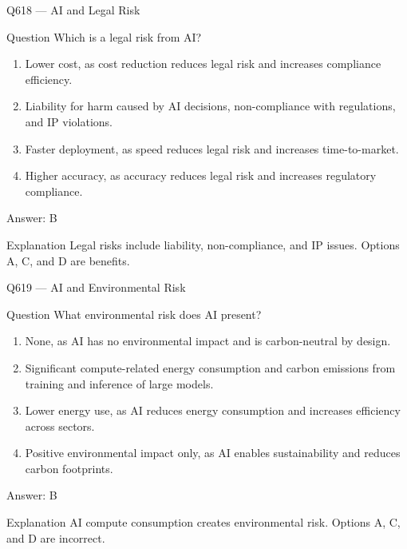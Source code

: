\documentclass[aspectratio=169,8pt]{beamer}
\begin{document}
	\begin{frame}{Q618 --- AI and Legal Risk}
		\begin{block}{Question}
			Which is a legal risk from AI?
			\begin{enumerate}
				\item Lower cost, as cost reduction reduces legal risk and increases compliance efficiency.
				\item Liability for harm caused by AI decisions, non-compliance with regulations, and IP violations.
				\item Faster deployment, as speed reduces legal risk and increases time-to-market.
				\item Higher accuracy, as accuracy reduces legal risk and increases regulatory compliance.
			\end{enumerate}
		\end{block}
		\begin{exampleblock}{Answer: B}\end{exampleblock}
		\begin{block}{Explanation}
			Legal risks include liability, non-compliance, and IP issues. Options A, C, and D are benefits.
		\end{block}
	\end{frame}
	
	\begin{frame}{Q619 --- AI and Environmental Risk}
		\begin{block}{Question}
			What environmental risk does AI present?
			\begin{enumerate}
				\item None, as AI has no environmental impact and is carbon-neutral by design.
				\item Significant compute-related energy consumption and carbon emissions from training and inference of large models.
				\item Lower energy use, as AI reduces energy consumption and increases efficiency across sectors.
				\item Positive environmental impact only, as AI enables sustainability and reduces carbon footprints.
			\end{enumerate}
		\end{block}
		\begin{exampleblock}{Answer: B}\end{exampleblock}
		\begin{block}{Explanation}
			AI compute consumption creates environmental risk. Options A, C, and D are incorrect.
		\end{block}
	\end{frame}
	
\end{document}
